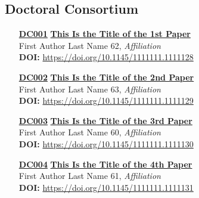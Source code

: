 \subsection{Doctoral Consortium}
\begin{enumerate}
\item[\href{https://doi.org/10.1145/1111111.1111128}{\textbf{DC001}}]
\href{https://doi.org/10.1145/1111111.1111128}{\textbf{This Is the Title of the 1st Paper}}\\
First Author Last Name 62, \emph{Affiliation}\\
\textbf{DOI:} \href{https://doi.org/10.1145/1111111.1111128}{https://doi.org/10.1145/1111111.1111128}\\

\item[\href{https://doi.org/10.1145/1111111.1111129}{\textbf{DC002}}]
\href{https://doi.org/10.1145/1111111.1111129}{\textbf{This Is the Title of the 2nd Paper}}\\
First Author Last Name 63, \emph{Affiliation}\\
\textbf{DOI:} \href{https://doi.org/10.1145/1111111.1111129}{https://doi.org/10.1145/1111111.1111129}\\

\item[\href{https://doi.org/10.1145/1111111.1111130}{\textbf{DC003}}]
\href{https://doi.org/10.1145/1111111.1111130}{\textbf{This Is the Title of the 3rd Paper}}\\
First Author Last Name 60, \emph{Affiliation}\\
\textbf{DOI:} \href{https://doi.org/10.1145/1111111.1111130}{https://doi.org/10.1145/1111111.1111130}\\

\item[\href{https://doi.org/10.1145/1111111.1111131}{\textbf{DC004}}]
\href{https://doi.org/10.1145/1111111.1111131}{\textbf{This Is the Title of the 4th Paper}}\\
First Author Last Name 61, \emph{Affiliation}\\
\textbf{DOI:} \href{https://doi.org/10.1145/1111111.1111131}{https://doi.org/10.1145/1111111.1111131}\\
\end{enumerate}


